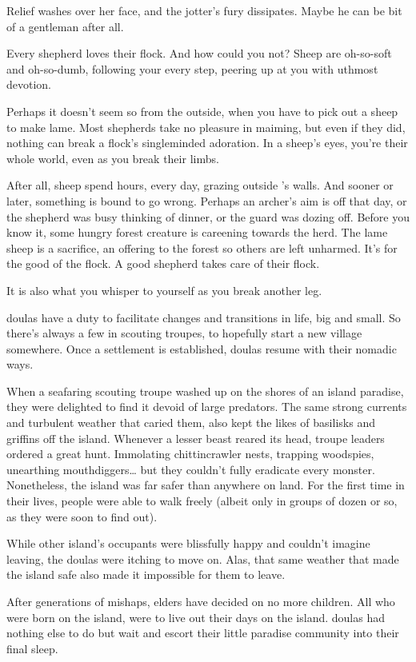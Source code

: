 \begin{multicols}{2}
\begin{exampletext}
  Relief washes over her face, and the \gls{jotter}'s fury dissipates.
  Maybe he can be bit of a gentleman after all.
\end{exampletext}

\begin{exampletext}
  Every shepherd loves their flock.
  And how could you not?
  Sheep are oh-so-soft and oh-so-dumb, following your every step, peering up at you with uthmost devotion.

  Perhaps it doesn't seem so from the outside, when you have to pick out a sheep to make lame.
  Most shepherds take no pleasure in maiming, but even if they did, nothing can break a flock's singleminded adoration.
  In a sheep's eyes, you're their whole world, even as you break their limbs.

  After all, sheep spend hours, every day, grazing outside 's walls.
  And sooner or later, something is bound to go wrong.
  Perhaps an archer's aim is off that day, or the shepherd was busy thinking of dinner, or the guard was dozing off.
  Before you know it, some hungry forest creature is careening towards the herd.
  The lame sheep is a sacrifice, an offering to the forest so others are left unharmed.
  It's for the good of the flock.
  A good shepherd takes care of their flock.

  It is also what you whisper to yourself as you break another leg.
\end{exampletext}

\begin{exampletext}
  \Glspl{doula} have a duty to facilitate changes and transitions in life, big and small.
  So there's always a few in scouting troupes, to hopefully start a new \gls{village} somewhere.
  Once a settlement is established, \glspl{doula} resume with their nomadic ways.

  When a seafaring scouting troupe washed up on the shores of an island paradise, they were delighted to find it devoid of large predators.
  The same strong currents and turbulent weather that caried them, also kept the likes of basilisks and griffins off the island.
  Whenever a lesser beast reared its head, troupe leaders ordered a great hunt.
  Immolating chittincrawler nests, trapping woodspies, unearthing mouthdiggers\ldots
  but they couldn't fully eradicate every monster.
  Nonetheless, the island was far safer than anywhere on land.
  For the first time in their lives, people were able to walk freely (albeit only in groups of dozen or so, as they were soon to find out).

  While other island's occupants were blissfully happy and couldn't imagine leaving, the \glspl{doula} were itching to move on.
  Alas, that same weather that made the island safe also made it impossible for them to leave.

  After generations of mishaps, elders have decided on no more children.
  All who were born on the island, were to live out their days on the island.
  \Glspl{doula} had nothing else to do but wait and escort their little paradise community into their final sleep.

\end{exampletext}

\end{multicols}
